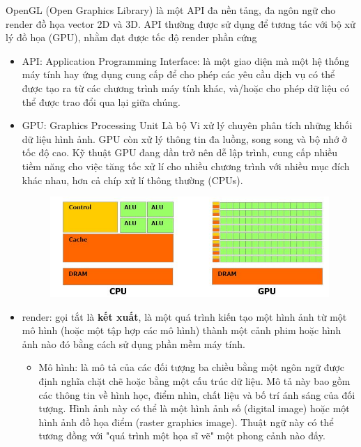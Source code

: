 OpenGL (Open Graphics Library) là một API đa nền tảng,
 đa ngôn ngữ cho render đồ họa vector 2D và 3D. API thường 
 được sử dụng để tương tác với bộ xử lý đồ họa (GPU), 
nhằm đạt được tốc độ render phần cứng

\begin {itemize}
\item API: Application Programming Interface: là một giao diện mà một hệ 
thống máy tính hay ứng dụng cung cấp để cho phép các yêu cầu dịch vụ 
có thể được tạo ra từ các chương trình máy tính khác, và/hoặc cho phép dữ liệu 
có thể được trao đổi qua lại giữa chúng. 
\item GPU: Graphics Processing Unit
Là bộ Vi xử lý chuyên phân tích những khối dữ liệu hình ảnh. 
GPU còn xử lý thông tin đa luồng, song song và bộ nhớ ở tốc độ cao.
 Kỹ thuật GPU đang dần trở nên dễ lập trình, cung cấp nhiều tiềm năng 
 cho việc tăng tốc xử lí cho nhiều chương trình với nhiều mục đích khác nhau,
  hơn cả chíp xử lí thông thường (CPUs).
\begin{figure}[ht]
\centering
\includegraphics[scale=0.5]{1112_cpu-va-gpu-1.jpg}
\end{figure}


\item render:
gọi tắt là \textbf{kết xuất}, là một quá trình kiến tạo một hình ảnh từ
 một
 mô hình (hoặc một tập hợp các mô hình) thành một cảnh phim 
hoặc hình ảnh nào đó bằng cách sử dụng phần mềm máy tính. 

\begin{itemize}
    \item Mô hình: là mô tả của các đối tượng ba chiều bằng một ngôn ngữ 
    được định nghĩa chặt chẽ hoặc bằng một cấu trúc dữ liệu. Mô tả này bao 
    gồm các thông tin về hình học, điểm nhìn, chất liệu và bố trí ánh sáng 
    của đối tượng. Hình ảnh này có thể là một hình ảnh số (digital image) 
    hoặc một hình ảnh đồ họa điểm (raster graphics image). Thuật ngữ này
     có
     thể tương đồng 
    với "quá trình một họa sĩ vẽ" một phong cảnh nào đấy.

    \end{itemize}


\end{itemize}